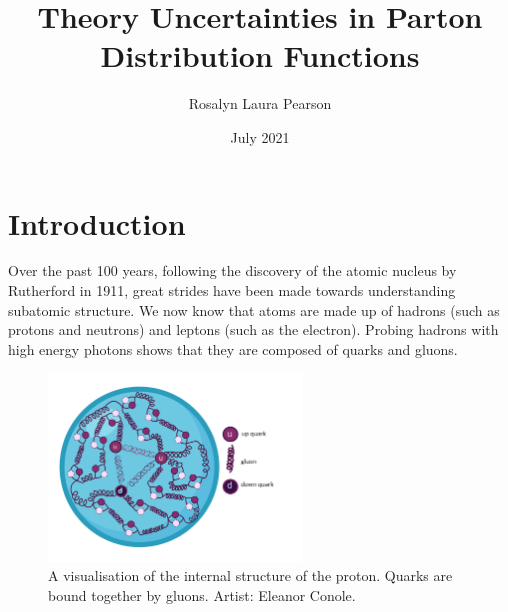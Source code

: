 \documentclass[a4paper,12pt,oneside,openright]{book}
\title{Theory Uncertainties in Parton Distribution Functions}
\author{Rosalyn Laura Pearson}
\date{July 2021} %
\numberwithin{equation}{section}
\numberwithin{figure}{section}
\numberwithin{table}{section}
\begin{document}
\singlespacing
\maketitlepage
\frontmatter
\eighteenptleading




\singlespacing
\makedeclaration



\tableofcontents

\cleardoublepage
{}
{}
\setcounter{tocdepth}{2}

\cleardoublepage
{}
{}
\listoffigures

\cleardoublepage
{}
{}
\listoftables

\section*{Introduction} %
Over the past 100 years, following the discovery of the atomic nucleus by Rutherford in 1911, great
strides have been made towards understanding subatomic structure. We now know that atoms are made up of hadrons (such as protons and neutrons) and leptons
(such as the electron). Probing hadrons with high energy photons shows that
they are composed of quarks and gluons.
\begin{figure}[H]
\centering
\includegraphics[width=0.6\textwidth]{proton.pdf}
\caption{A visualisation of the internal structure of the proton. Quarks are bound together by gluons. Artist: Eleanor Conole.\label{fig:proton}}
\end{figure}
\end{document}
